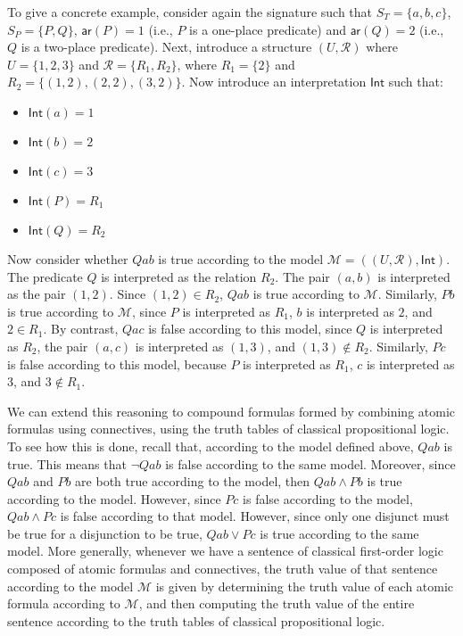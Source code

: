 \documentclass[11pt]{article}
\theoremstyle{definition}
\theoremstyle{remark}
\begin{document}
To give a concrete example, consider again the signature such that $S_{T}=\{a,b,c\}$, $S_{P}=\{P,Q\}$, $\textsf{ar}(P)=1$ (i.e., $P$ is a one-place predicate) and $\textsf{ar}(Q)=2$ (i.e., $Q$ is a two-place predicate). Next, introduce a structure $(U,\mathcal{R})$ where $U=\{1,2,3\}$ and $\mathcal{R}=\{R_{1},R_{2}\}$, where $R_{1}=\{2\}$ and $R_{2}=\{(1,2),(2,2),(3,2)\}$. Now introduce an interpretation $\textsf{Int}$ such that:
\begin{itemize}
    \item $\textsf{Int}(a)=1$

    \item $\textsf{Int}(b)=2$

    \item $\textsf{Int}(c)=3$

    \item $\textsf{Int}(P) = R_{1}$

    \item $\textsf{Int}(Q) = R_{2}$
\end{itemize}
Now consider whether $Qab$ is true according to the model $\mathcal{M}=((U,\mathcal{R}),\textsf{Int})$. The predicate $Q$ is interpreted as the relation $R_{2}$. The pair $(a,b)$ is interpreted as the pair $(1,2)$. Since $(1,2)\in R_{2}$, $Qab$ is true according to $\mathcal{M}$. Similarly, $Pb$ is true according to $\mathcal{M}$, since $P$ is interpreted as $R_{1}$, $b$ is interpreted as $2$, and $2\in R_{1}$. By contrast, $Qac$ is false according to this model, since $Q$ is interpreted as $R_{2}$, the pair $(a,c)$ is interpreted as $(1,3)$, and $(1,3)\not\in R_{2}$. Similarly, $Pc$ is false according to this model, because $P$ is interpreted as $R_{1}$, $c$ is interpreted as $3$, and $3\not\in R_{1}$.\par 


We can extend this reasoning to compound formulas formed by combining atomic formulas using connectives, using the truth tables of classical propositional logic. To see how this is done, recall that, according to the model defined above, $Qab$ is true. This means that $\neg Qab$ is false according to the same model. Moreover, since $Qab$ and $Pb$ are both true according to the model, then $Qab\wedge Pb$ is true according to the model. However, since $Pc$ is false according to the model, $Qab\wedge Pc$ is false according to that model. However, since only one disjunct must be true for a disjunction to be true, $Qab\vee Pc$ is true according to the same model. More generally, whenever we have a sentence of classical first-order logic composed of atomic formulas and connectives, the truth value of that sentence according to the model $\mathcal{M}$ is given by determining the truth value of each atomic formula according to $\mathcal{M}$, and then computing the truth value of the entire sentence according to the truth tables of classical propositional logic.\par 
\end{document}
